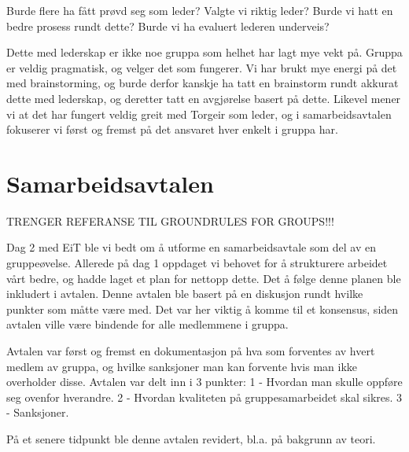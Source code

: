 Burde flere ha fått prøvd seg som leder?
Valgte vi riktig leder?
Burde vi hatt en bedre prosess rundt dette?
Burde vi ha evaluert lederen underveis?

Dette med lederskap er ikke noe gruppa som helhet har lagt mye vekt på. Gruppa
er veldig pragmatisk, og velger det som fungerer. Vi har brukt mye energi på
det med brainstorming, og burde derfor kanskje ha tatt en brainstorm rundt
akkurat dette med lederskap, og deretter tatt en avgjørelse basert på dette.
Likevel mener vi at det har fungert veldig greit med Torgeir som leder, og i
samarbeidsavtalen fokuserer vi først og fremst på det ansvaret hver enkelt i
gruppa har.


\chapter{Samarbeidsavtalen}

TRENGER REFERANSE TIL GROUNDRULES FOR GROUPS!!!

Dag 2 med EiT ble vi bedt om å utforme en samarbeidsavtale som del av en 
gruppeøvelse. Allerede på dag 1 oppdaget vi behovet for å strukturere arbeidet
vårt bedre, og hadde laget et plan for nettopp dette. Det å følge denne planen
ble inkludert i avtalen. Denne avtalen ble basert på en diskusjon rundt hvilke
punkter som måtte være med. Det var her viktig å komme til et konsensus, siden
avtalen ville være bindende for alle medlemmene i gruppa.

Avtalen var først og fremst en dokumentasjon på hva som forventes av hvert
medlem av gruppa, og hvilke sanksjoner man kan forvente hvis man ikke
overholder disse. Avtalen var delt inn i 3 punkter: 
	1 - Hvordan man skulle oppføre seg ovenfor hverandre.
	2 - Hvordan kvaliteten på gruppesamarbeidet skal sikres.
	3 - Sanksjoner.

På et senere tidpunkt ble denne avtalen revidert, bl.a. på bakgrunn av teori.
